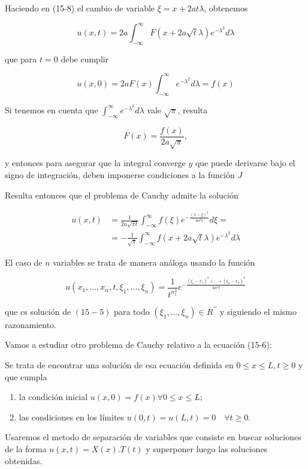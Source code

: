 \documentclass[10pt]{article}
\theoremstyle{plain}
\theoremstyle{definition}
\theoremstyle{remark}
\begin{document}
Haciendo en (15-8) el cambio de variable $\xi=x+2 a t \lambda$, obtenemos

$$
u(x, t)=2 a \int_{-\infty}^{\infty} F(x+2 a \sqrt{t} \lambda) e^{-\lambda^{2}} d \lambda
$$

que para $t=0$ debe cumplir

$$
u(x, 0)=2 a F(x) \int_{-\infty}^{\infty} e^{-\lambda^{2}} d \lambda=f(x)
$$

Si tenemos en cuenta que $\int_{-\infty}^{\infty} e^{-\lambda^{2}} d \lambda$ vale $\sqrt{\pi}$, resulta

$$
F(x)=\frac{f(x)}{2 a \sqrt{\pi}},
$$

y entonces para asegurar que la integral converge $y$ que puede derivarse bajo el signo de integración, deben imponerse condiciones a la función $J$

Resulta entonces que el problema de Cauchy admite la solución

$$
\begin{aligned}
u(x, t) & =\frac{1}{2 a \sqrt{\pi t}} \int_{-\infty}^{\infty} f(\xi) e^{-\frac{(x-\xi)^{2}}{4 a^{2} t}} d \xi= \\
& =-\frac{1}{\sqrt{\pi}} \int_{-\infty}^{\infty} f(x+2 a \sqrt{t} \lambda) e^{-\lambda^{2}} d \lambda
\end{aligned}
$$

El caso de $n$ variables se trata de manera análoga usando la función

$$
u\left(x_{1}, \ldots, x_{n}, t, \xi_{1}, \ldots, \xi_{n}\right)=\frac{1}{t^{n_{1}^{2}}} e^{-\frac{\left(\xi_{1}-x_{1}\right)^{2}+\ldots+\left(\xi_{n}-x_{n}\right)^{2}}{4 a^{2} t}}
$$

que cs solución de $(15-5)$ para todo $\left(\xi_{1}, \ldots, \xi_{n}\right) \in R^{\prime \prime}$ y siguiendo el mismo razonamiento.

Vamos a estudiar otro problema de Cauchy relativo a la ecuación (15-6):

Se trata de encontrar una solución de esa ecuación definida en $0 \leqslant x \leqslant L, t \geqslant 0$ y que cumpla

\begin{enumerate}
  \item la condición inicial $u(x, 0)=f(x) \forall 0 \leqslant x \leqslant L$;
  \item las condiciones en los límites $u(0, t)=u(L, t)=0 \quad \forall t \geqslant 0$.
\end{enumerate}

Usaremos el metodo de separación de variables que consiste en buscar soluciones de la forma $u(x, t)=X(x) . T(t)$ y superponer luego las soluciones obtenidas.
\end{document}

